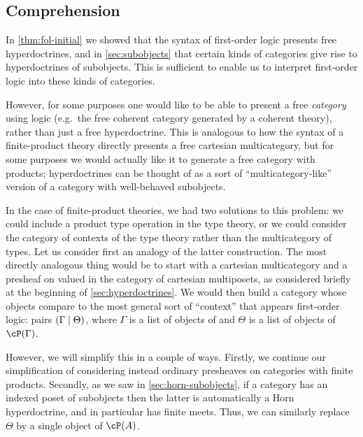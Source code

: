 \begin{wip}
\section{Comprehension}
\label{sec:comprehension}

In \cref{thm:fol-initial} we showed that the syntax of first-order logic presents free hyperdoctrines, and in \cref{sec:subobjects} that certain kinds of categories give rise to hyperdoctrines of subobjects.
This is sufficient to enable us to interpret first-order logic into these kinds of categories.

However, for some purposes one would like to be able to present a free \emph{category} using logic (e.g.\ the free coherent category generated by a coherent theory), rather than just a free hyperdoctrine.
This is analogous to how the syntax of a finite-product theory directly presents a free cartesian multicategory, but for some purposes we would actually like it to generate a free category with products; hyperdoctrines can be thought of as a sort of ``multicategory-like'' version of a category with well-behaved subobjects.

In the case of finite-product theories, we had two solutions to this problem: we could include a product type operation in the type theory, or we could consider the category of contexts of the type theory rather than the multicategory of types.
Let us consider first an analogy of the latter construction.
The most directly analogous thing would be to start with a cartesian multicategory \bS and a presheaf \cP on \bS valued in the category of cartesian multiposets, as considered briefly at the beginning of \cref{sec:hyperdoctrines}.
We would then build a category whose objects compare to the most general sort of ``context'' that appears first-order logic: pairs $(\Gamma\mid\Theta)$, where $\Gamma$ is a list of objects of \cS and $\Theta$ is a list of objects of $\cP(\Gamma)$.

However, we will simplify this in a couple of ways.
Firstly, we continue our simplification of considering instead ordinary presheaves on categories \cS with finite products.
Secondly, as we saw in \cref{sec:horn-subobjects}, if a category has an indexed poset of subobjects then the latter is automatically a Horn hyperdoctrine, and in particular has finite meets.
Thus, we can similarly replace $\Theta$ by a single object of $\cP(A)$.


\end{wip}
